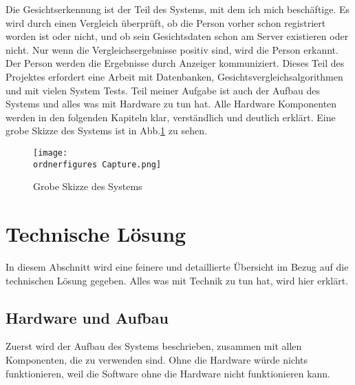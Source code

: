 Die Gesichtserkennung ist der Teil des Systems, mit dem ich mich beschäftige.
Es wird durch einen Vergleich überprüft, ob die Person vorher schon registriert worden ist oder nicht, und ob sein Gesichtsdaten schon am Server existieren oder nicht. Nur wenn die Vergleichsergebnisse positiv sind, wird die Person erkannt.
Der Person werden die Ergebnisse durch Anzeiger kommuniziert. Dieses Teil des Projektes erfordert eine Arbeit mit Datenbanken, Gesichtsvergleichsalgorithmen und mit vielen System Tests. Teil meiner Aufgabe ist auch der Aufbau des Systems und alles was mit Hardware zu tun hat. Alle Hardware Komponenten werden in den folgenden Kapiteln klar, verständlich und deutlich erklärt. Eine grobe Skizze des Systems ist in Abb.\ref{fig:grobe_Skizze} zu sehen.
\begin{figure}[H]
	\texttt{[image: \\ordnerfigures Capture.png]}
	\caption{Grobe Skizze des Systems}
	\label{fig:grobe_Skizze}
\end{figure}
\section{Technische Lösung}
In diesem Abschnitt wird eine feinere und detaillierte Übersicht im Bezug auf die technischen Lösung gegeben. Alles was mit Technik zu tun hat, wird hier erklärt.
\subsection{Hardware und Aufbau}
Zuerst wird der Aufbau des Systems beschrieben, zusammen mit allen Komponenten, die zu verwenden sind. Ohne die Hardware würde nichts funktionieren, weil die Software ohne die Hardware nicht funktionieren kann.
